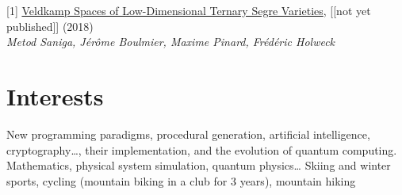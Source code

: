 \documentclass[10pt,a4paper,sans]{moderncv}
\begin{document}

	\vspace*{\deletedSpace}
	\begin{thebibliography}{}
		[1] \href{https://arxiv.org/abs/1806.08965}{Veldkamp Spaces of Low-Dimensional Ternary Segre Varieties}, [[not yet published]] (2018)\\
		\textit{Metod Saniga, Jérôme Boulmier, Maxime Pinard, Frédéric Holweck}
	\end{thebibliography}


	\vspace*{\deletedSpace}
	\section{Interests}
			{New programming paradigms, procedural generation, artificial intelligence, cryptography\ldots, their implementation, and the evolution of quantum computing.}
			{Mathematics, physical system simulation, quantum physics\ldots}
			{Skiing and winter sports, cycling (mountain biking in a club for 3 years), mountain hiking}
\end{document}
